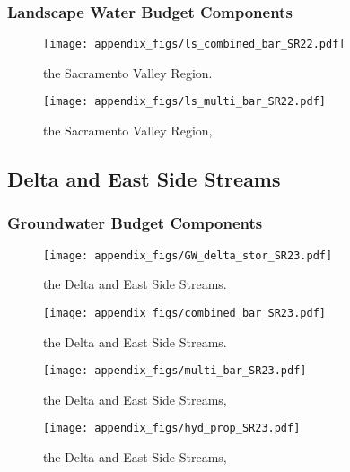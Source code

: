 \subsubsection{Landscape Water Budget Components}
\begin{figure}[ht]
\centerline{\texttt{[image: appendix\_figs/ls\_combined\_bar\_SR22.pdf]}}
\caption{\LSCombinedTextOne the Sacramento Valley Region.\LSCombinedTextTwo}
\label{fig:LS_budget_SR22}
\end{figure}
\newpage

\begin{landscape}
\begin{figure}[ht]
\centerline{\texttt{[image: appendix\_figs/ls\_multi\_bar\_SR22.pdf]}}
\caption{\LSMultiTextOne the Sacramento Valley Region,\LSMultiTextTwo}
\label{fig:multi_LS_budget_SR22}
\end{figure}
\newpage
\end{landscape}

\subsection{Delta and East Side Streams}
\subsubsection{Groundwater Budget Components}
\begin{figure}[h]
\centerline{\texttt{[image: appendix\_figs/GW\_delta\_stor\_SR23.pdf]}}
\caption{\GWBudgetText the Delta and East Side Streams.}
\label{fig:delta_stor_SR23}
\end{figure}
\newpage

\begin{figure}[ht]
\centerline{\texttt{[image: appendix\_figs/combined\_bar\_SR23.pdf]}}
\caption{\GWCombinedTextOne the Delta and East Side Streams.\GWCombinedTextTwo}
\label{fig:GW_budget_SR23}
\end{figure}
\newpage

\begin{landscape}
\begin{figure}[ht]
\centerline{\texttt{[image: appendix\_figs/multi\_bar\_SR23.pdf]}}
\caption{\GWMultiTextOne the Delta and East Side Streams,\GWMultiTextTwo}
\label{fig:multi_GW_budget_SR23}
\end{figure}
\newpage

\begin{figure}[ht]
\centerline{\texttt{[image: appendix\_figs/hyd\_prop\_SR23.pdf]}}
\caption{\HydPropOne the Delta and East Side Streams,\HydPropTwo}
\label{fig:hyd_prop_SR23}
\end{figure}
\newpage
\end{landscape}


